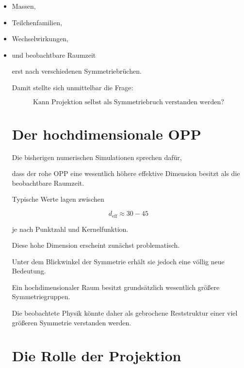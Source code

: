 \begin{itemize}

\item

Massen,

\item

Teilchenfamilien,

\item

Wechselwirkungen,

\item

und beobachtbare Raumzeit

erst nach verschiedenen Symmetriebrüchen.

Damit stellte sich unmittelbar die Frage:

\[
\boxed{
\text{Kann Projektion selbst als Symmetriebruch verstanden werden?}
}
\]


\section*{Der hochdimensionale OPP}

Die bisherigen numerischen Simulationen sprechen dafür,

dass der rohe OPP eine wesentlich höhere effektive Dimension besitzt als die beobachtbare Raumzeit.

Typische Werte lagen zwischen

\[
d_{\mathrm{eff}}
\approx
30
-
45
\]

je nach Punktzahl und Kernelfunktion.

Diese hohe Dimension erscheint zunächst problematisch.

Unter dem Blickwinkel der Symmetrie erhält sie jedoch eine völlig neue Bedeutung.

Ein hochdimensionaler Raum besitzt grundsätzlich wesentlich größere Symmetriegruppen.

Die beobachtete Physik könnte daher als gebrochene Reststruktur einer viel größeren Symmetrie verstanden werden.


\section*{Die Rolle der Projektion}


\end{itemize}
